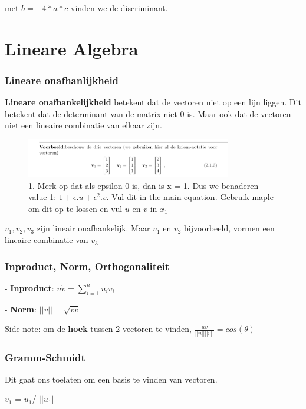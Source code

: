 \documentclass[a4paper]{report}
\begin{document}
met $b = -4*a*c$ vinden we de discriminant.

\chapter{Lineare Algebra}

\subsection{Lineare onafhanlijkheid}

\textbf{Lineare onafhankelijkheid} betekent dat de vectoren niet op een lijn liggen. Dit betekent dat de determinant van de matrix niet 0 is.
Maar ook dat de vectoren niet een lineaire combinatie van elkaar zijn.

\begin{figure}[htbp!]
	\centering
	\includegraphics[width=0.8\textwidth]{images/ex_lin_on.png}
	\caption{1. Merk op dat als epsilon 0 is, dan is x = 1. Dus we benaderen value 1: $1 + \epsilon . u + \epsilon^2 . v$. Vul dit in the main equation. Gebruik maple om dit op te lossen en vul $u$ en $v$ in $x_1$}
\end{figure}

$v_1, v_2, v_3$ zijn lineair onafhankelijk. Maar $v_1$ en $v_2$ bijvoorbeeld, vormen een lineaire combinatie van $v_3$

\subsection{Inproduct, Norm, Orthogonaliteit}

- \textbf{Inproduct}: $u \dot v = \sum_{i=1}^{n} u_i v_i$

- \textbf{Norm}: $||v|| = \sqrt{v \dot v}$

Side note: om de \textbf{hoek} tussen 2 vectoren te vinden, $\frac{u\dot v}{||u|| ||v||} = cos(\theta)$

\subsection{Gramm-Schmidt}

Dit gaat ons toelaten om een basis te vinden van vectoren.

$v_1$ = $u_1$/ $||u_1||$
\end{document}
